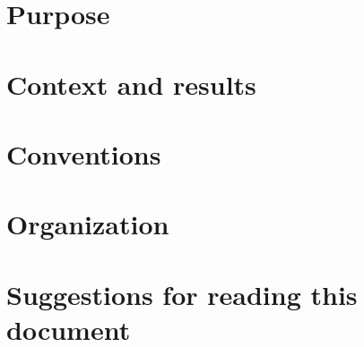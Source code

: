 \section{Purpose}                                                                                     
\section{Context and results}                                                                         
\section{Conventions}                                \label{sec: introduction/conventions}            
\section{Organization}                               \label{sec: introduction/organization}              
\section{Suggestions for reading this document}                                                       
